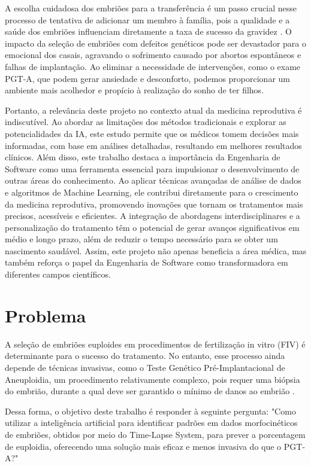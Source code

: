 A escolha cuidadosa dos embriões para a transferência é um passo crucial nesse processo de tentativa de adicionar um membro à família, pois a qualidade e a saúde dos embriões influenciam diretamente a taxa de sucesso da gravidez \cite{yang2024}. O impacto da seleção de embriões com defeitos genéticos pode ser devastador para o emocional dos casais, agravando o sofrimento causado por abortos espontâneos e falhas de implantação. Ao eliminar a necessidade de intervenções, como o exame PGT-A, que podem gerar ansiedade e desconforto, podemos proporcionar um ambiente mais acolhedor e propício à realização do sonho de ter filhos.

Portanto, a relevância deste projeto no contexto atual da medicina reprodutiva é indiscutível. Ao abordar as limitações dos métodos tradicionais e explorar as potencialidades da IA, este estudo permite que os médicos tomem decisões mais informadas, com base em análises detalhadas, resultando em melhores resultados clínicos. Além disso, este trabalho destaca a importância da Engenharia de Software como uma ferramenta essencial para impulsionar o desenvolvimento de outras áreas do conhecimento. Ao aplicar técnicas avançadas de análise de dados e algoritmos de Machine Learning, ele contribui diretamente para o crescimento da medicina reprodutiva, promovendo inovações que tornam os tratamentos mais precisos, acessíveis e eficientes. A integração de abordagens interdisciplinares e a personalização do tratamento têm o potencial de gerar avanços significativos em médio e longo prazo, além de reduzir o tempo necessário para se obter um nascimento saudável. Assim, este projeto não apenas beneficia a área médica, mas também reforça o papel da Engenharia de Software como transformadora em diferentes campos científicos.

\section{Problema}

A seleção de embriões euploides em procedimentos de fertilização in vitro (FIV) é determinante para o sucesso do tratamento. No entanto, esse processo ainda depende de técnicas invasivas, como o Teste Genético Pré-Implantacional de Aneuploidia, um procedimento relativamente complexo, pois requer uma biópsia do embrião, durante a qual deve ser garantido o mínimo de danos ao embrião \cite{yang2024}.

Dessa forma, o objetivo deste trabalho é responder à seguinte pergunta: "Como utilizar a inteligência artificial para identificar padrões em dados morfocinéticos de embriões, obtidos por meio do Time-Lapse System, para prever a porcentagem de euploidia, oferecendo uma solução mais eficaz e menos invasiva do que o PGT-A?"

